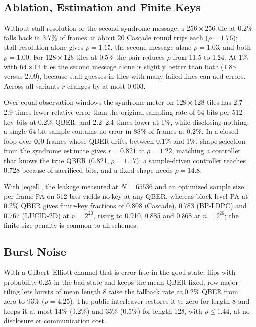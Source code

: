 \documentclass[conference]{IEEEtran}
\begin{document}
\subsection{Ablation, Estimation and Finite Keys}
Without stall resolution or the second syndrome message, a $256\times256$ tile at 0.2\% falls back in 3.7\% of frames at about 20 Cascade round trips each ($\rho=1.76$); stall resolution alone gives $\rho=1.15$, the second message alone $\rho=1.03$, and both $\rho=1.00$. For $128\times128$ tiles at 0.5\% the pair reduces $\rho$ from 11.5 to 1.24. At 1\% with $64\times64$ tiles the second message alone is slightly better than both (1.85 versus 2.09), because stall guesses in tiles with many failed lines can add errors. Across all variants $r$ changes by at most 0.003.

Over equal observation windows the syndrome meter on $128\times128$ tiles has 2.7--2.9 times lower relative error than the original sampling rate of 64 bits per 512 key bits at 0.2\% QBER, and 2.2--2.4 times lower at 1\%, while disclosing nothing; a single 64-bit sample contains no error in 88\% of frames at 0.2\%. In a closed loop over 600 frames whose QBER drifts between 0.1\% and 1\%, shape selection from the syndrome estimate gives $r=0.821$ at $\rho=1.22$, matching a controller that knows the true QBER (0.821, $\rho=1.17$); a sample-driven controller reaches 0.728 because of sacrificed bits, and a fixed shape needs $\rho=14.8$.

With \eqref{eq:ell}, the leakage measured at $N=65536$ and an optimized sample size, per-frame PA on 512 bits yields no key at any QBER, whereas block-level PA at 0.2\% QBER gives finite-key fractions of 0.808 (Cascade), 0.783 (BP-LDPC) and 0.767 (LUCID-2D) at $n=2^{20}$, rising to 0.910, 0.885 and 0.868 at $n=2^{26}$; the finite-size penalty is common to all schemes.

\subsection{Burst Noise}\label{sec:burst}
With a Gilbert--Elliott channel that is error-free in the good state, flips with probability 0.25 in the bad state and keeps the mean QBER fixed, row-major tiling lets bursts of mean length 8 raise the fallback rate at 0.2\% QBER from zero to 93\% ($\rho=4.25$). The public interleaver restores it to zero for length 8 and keeps it at most 14\% (0.2\%) and 35\% (0.5\%) for length 128, with $\rho\le1.44$, at no disclosure or communication cost.
\end{document}
